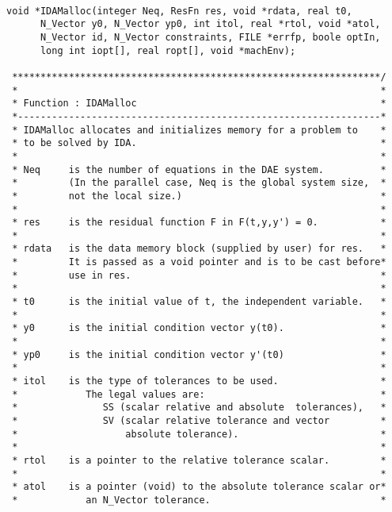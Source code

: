 \documentclass[11pt]{article}
\begin{document}
\small
\begin{verbatim}

void *IDAMalloc(integer Neq, ResFn res, void *rdata, real t0,
      N_Vector y0, N_Vector yp0, int itol, real *rtol, void *atol, 
      N_Vector id, N_Vector constraints, FILE *errfp, boole optIn, 
      long int iopt[], real ropt[], void *machEnv);

 *****************************************************************/
 *                                                                *
 * Function : IDAMalloc                                           *
 *----------------------------------------------------------------*
 * IDAMalloc allocates and initializes memory for a problem to    *
 * to be solved by IDA.                                           *
 *                                                                *
 * Neq     is the number of equations in the DAE system.          *
 *         (In the parallel case, Neq is the global system size,  *
 *         not the local size.)                                   *
 *                                                                *
 * res     is the residual function F in F(t,y,y') = 0.           *          
 *                                                                *
 * rdata   is the data memory block (supplied by user) for res.   *
 *         It is passed as a void pointer and is to be cast before*
 *         use in res.                                            *
 *                                                                *
 * t0      is the initial value of t, the independent variable.   *
 *                                                                *
 * y0      is the initial condition vector y(t0).                 *
 *                                                                *
 * yp0     is the initial condition vector y'(t0)                 *
 *                                                                *
 * itol    is the type of tolerances to be used.                  *
 *            The legal values are:                               *
 *               SS (scalar relative and absolute  tolerances),   *
 *               SV (scalar relative tolerance and vector         *
 *                   absolute tolerance).                         *
 *                                                                *
 * rtol    is a pointer to the relative tolerance scalar.         *
 *                                                                *
 * atol    is a pointer (void) to the absolute tolerance scalar or*
 *            an N_Vector tolerance.                              *

\end{verbatim}
\end{document}
